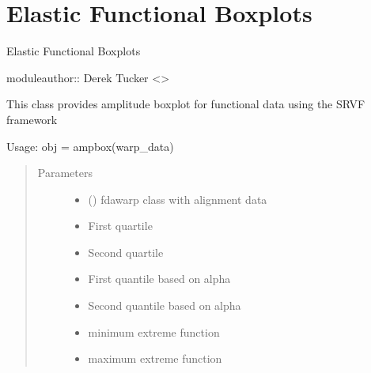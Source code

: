 \documentclass[letterpaper,10pt,english]{sphinxmanual}
\begin{document}
\chapter{Elastic Functional Boxplots}
\label{\detokenize{boxplots:module-boxplots}}\label{\detokenize{boxplots:elastic-functional-boxplots}}\label{\detokenize{boxplots::doc}}
Elastic Functional Boxplots

moduleauthor:: Derek Tucker \textless{}\textgreater{}

\begin{fulllineitems}
\label{\detokenize{boxplots:boxplots.ampbox}}
This class provides amplitude boxplot for functional data using the
SRVF framework

Usage:  obj = ampbox(warp\_data)
\begin{quote}\begin{description}
\item[{Parameters}] \leavevmode\begin{itemize}
\item {} 
 ({\hyperref[\detokenize{time_warping:time_warping.fdawarp}]{}}) \textendash{} fdawarp class with alignment data

\item {} 
 \textendash{} First quartile

\item {} 
 \textendash{} Second quartile

\item {} 
 \textendash{} First quantile based on alpha

\item {} 
 \textendash{} Second quantile based on alpha

\item {} 
 \textendash{} minimum extreme function

\item {} 
 \textendash{} maximum extreme function


\end{itemize}
\end{description}
\end{quote}
\end{fulllineitems}
\end{document}
